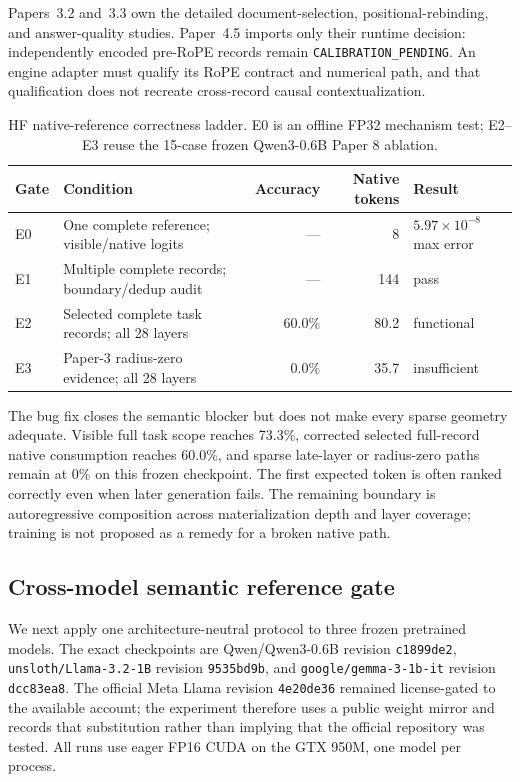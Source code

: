\documentclass[11pt]{article}
\begin{document}
Papers~3.2 and~3.3 own the detailed document-selection, positional-rebinding,
and answer-quality studies.  Paper~4.5 imports only their runtime decision:
independently encoded pre-RoPE records remain
\texttt{CALIBRATION\_PENDING}.  An engine adapter must qualify its RoPE contract
and numerical path, and that qualification does not recreate cross-record
causal contextualization.

\begin{table}[H]
\centering
\caption{HF native-reference correctness ladder. E0 is an offline FP32 mechanism
test; E2--E3 reuse the 15-case frozen Qwen3-0.6B Paper 8 ablation.}
\begin{tabularx}{\linewidth}{l Y r r l}
\toprule
Gate & Condition & Accuracy & Native tokens & Result\\
\midrule
E0 & One complete reference; visible/native logits & --- & 8 & $5.97\times10^{-8}$ max error\\
E1 & Multiple complete records; boundary/dedup audit & --- & 144 & pass\\
E2 & Selected complete task records; all 28 layers & 60.0\% & 80.2 & functional\\
E3 & Paper-3 radius-zero evidence; all 28 layers & 0.0\% & 35.7 & insufficient\\
\bottomrule
\end{tabularx}
\end{table}

The bug fix closes the semantic blocker but does not make every sparse geometry
adequate. Visible full task scope reaches 73.3\%, corrected selected full-record
native consumption reaches 60.0\%, and sparse late-layer or radius-zero paths
remain at 0\% on this frozen checkpoint. The first expected token is often
ranked correctly even when later generation fails. The remaining boundary is
autoregressive composition across materialization depth and layer coverage;
training is not proposed as a remedy for a broken native path.

\subsection{Cross-model semantic reference gate}

We next apply one architecture-neutral protocol to three frozen pretrained
models. The exact checkpoints are Qwen/Qwen3-0.6B revision
\texttt{c1899de2}, \texttt{unsloth/Llama-3.2-1B} revision \texttt{9535bd9b},
and \texttt{google/gemma-3-1b-it} revision \texttt{dcc83ea8}. The official
Meta Llama revision \texttt{4e20de36} remained license-gated to the available
account; the experiment therefore uses a public weight mirror and records that
substitution rather than implying that the official repository was tested.
All runs use eager FP16 CUDA on the GTX 950M, one model per process.
\end{document}
